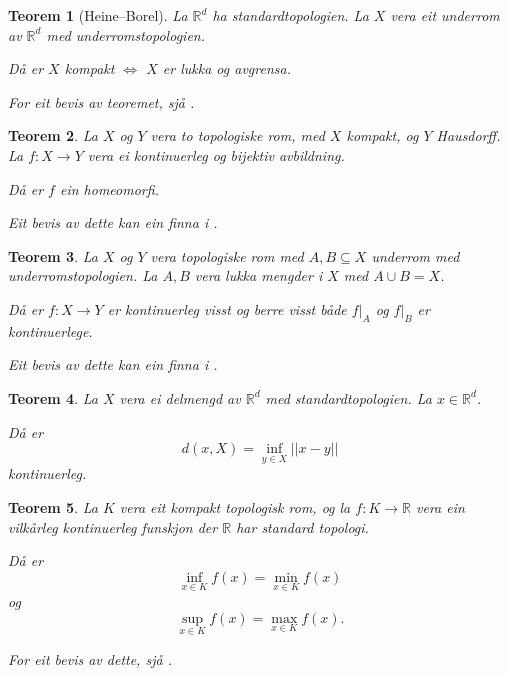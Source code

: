 \documentclass[a4paper, 12pt, norsk]{article}
\theoremstyle{plain}
\newtheorem{theorem}{Teorem}[section]
\theoremstyle{definition}
\newcommand{\Rb}{\mathbb{R}}
\newcommand{\union}{ \mathop{\cup}\limits }
\begin{document}
\begin{theorem}[Heine--Borel] \label{thm:heine-borel} 
	La \( \Rb^d \) ha standardtopologien. La \( X \) vera eit underrom av \( \Rb^d \) med underromstopologien.
	
	Då er \( X \) kompakt \( \iff \) \( X \) er lukka og avgrensa.

	For eit bevis av teoremet, sjå \cite[s. 100]{MR3932132}.
\end{theorem}

\begin{theorem} \label{thm:closed-map-lemma-og-bijektiv-lukka}
	La \( X \) og \( Y \) vera to topologiske rom, med \( X \) kompakt, og \( Y \) Hausdorff. La \( f: X \to Y \) vera ei kontinuerleg og bijektiv avbildning.

	Då er \( f \) ein homeomorfi.

	Eit bevis av dette kan ein finna i \cite[s. 135--136]{MR2548039}.
\end{theorem}

\begin{theorem} \label{thm:pasting-lemma}
	La \( X \) og \( Y \) vera topologiske rom med \( A, B \subseteq X \) underrom med underromstopologien. La \( A, B \) vera lukka mengder i \( X \) med \( A \union B = X \). 
	
	Då er \( f: X \to Y \) er kontinuerleg visst og berre visst både \( f|_A \) og \( f|_B \) er kontinuerlege.

	Eit bevis av dette kan ein finna i \cite[s. 108--109]{MR3728284}.
\end{theorem}

\begin{theorem} \label{thm:distanse-er-kont}
	La \( X \) vera ei delmengd av \( \Rb^d \) med standardtopologien. La \( x \in \Rb^d \). 
	
	Då er
	\[
		d(x, X) = \inf_{y \in X} ||x-y||
	\]
	kontinuerleg.
\end{theorem}

\begin{theorem} \label{thm:infimum-over-kompakt-er-min} \label{thm:supremum-over-kompakt-er-maks}
	La \( K \) vera eit kompakt topologisk rom, og la \( f: K \to \Rb \) vera ein vilkårleg kontinuerleg funskjon der \( \Rb \) har standard topologi. 
	
	Då er
	\[
		\inf_{x \in K} f(x) = \min_{x \in K} f(x)
	\]
	og
	\[
		\sup_{x \in K} f(x) = \max_{x \in K} f(x).
	\]

	For eit bevis av dette, sjå \cite[s. 132]{MR2548039}.
\end{theorem}
\end{document}

